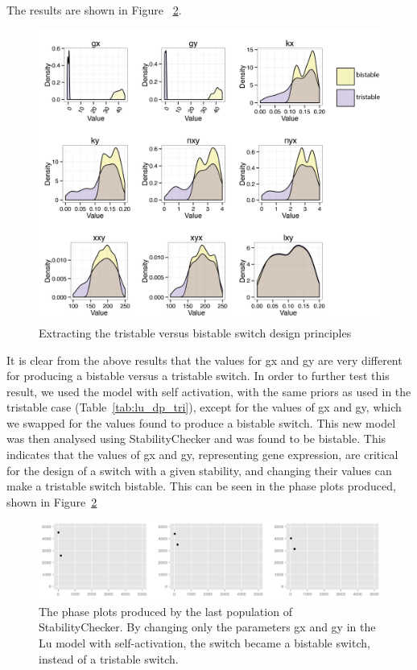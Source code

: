 The results are shown in Figure ~\ref{fig:lu_bi_tri}.
\clearpage
\begin{figure}[p]
\centering
\includegraphics[scale=0.8]{chapterModelling/images/design_principles/res_all_tri_biyp.png}
\caption{Extracting the tristable versus bistable switch design principles}
\label{fig:lu_bi_tri}
\end{figure}

It is clear from the above results that the values for gx and gy are very different for producing a bistable versus a tristable switch. In order to further test this result, we used the model with self activation, with the same priors as used in the tristable case (Table~\ref{tab:lu_dp_tri}), except for the values of gx and gy, which we swapped for the values found to produce a bistable switch. This new model was then analysed using StabilityChecker and was found to be bistable. This indicates that the values of gx and gy, representing gene expression, are critical for the design of a switch with a given stability, and changing their values can make a tristable switch bistable. This can be seen in the phase plots produced, shown in Figure~\ref{fig:lu_bi_tri}

\begin{figure}[p]
\centering
\includegraphics[scale=0.4]{chapterModelling/images/Lu/tri/phase_plot_tri_bi.png}
\caption{The phase plots produced by the last population of StabilityChecker. By changing only the parameters gx and gy in the Lu model with self-activation, the switch became a bistable switch, instead of a tristable switch.}
\label{fig:lu_bi_tri}
\end{figure}


